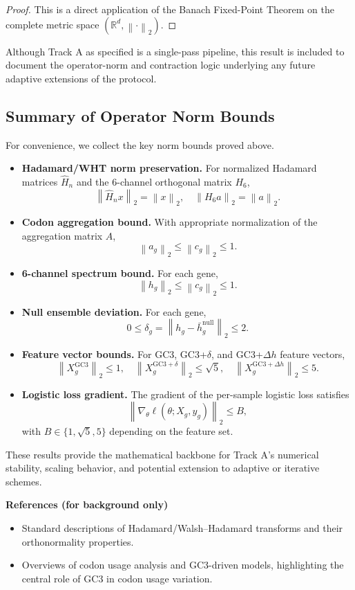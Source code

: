 \documentclass[11pt]{article}
\newcommand{\R}{\mathbb{R}}
\newcommand{\norm}[1]{\left\lVert #1 \right\rVert}
\begin{document}
\begin{proof}
This is a direct application of the Banach Fixed-Point Theorem on the complete metric space \((\R^d, \norm{\cdot}_2)\).
\end{proof}

Although Track A as specified is a single-pass pipeline, this result is included to document the operator-norm and contraction logic underlying any future adaptive extensions of the protocol.

\subsection{Summary of Operator Norm Bounds}

For convenience, we collect the key norm bounds proved above.

\begin{itemize}
  \item \textbf{Hadamard/WHT norm preservation.}
  For normalized Hadamard matrices \(\widehat{H}_n\) and the 6-channel orthogonal matrix \(H_6\),
  \[
    \norm{\widehat{H}_n x}_2 = \norm{x}_2, \quad
    \norm{H_6 a}_2 = \norm{a}_2.
  \]
  \item \textbf{Codon aggregation bound.}
  With appropriate normalization of the aggregation matrix \(A\),
  \[
    \norm{a_g}_2 \le \norm{c_g}_2 \le 1.
  \]
  \item \textbf{6-channel spectrum bound.}
  For each gene,
  \[
    \norm{h_g}_2 \le \norm{c_g}_2 \le 1.
  \]
  \item \textbf{Null ensemble deviation.}
  For each gene,
  \[
    0 \le \delta_g = \norm{h_g - \bar{h}_g^{\mathrm{null}}}_2 \le 2.
  \]
  \item \textbf{Feature vector bounds.}
  For GC3, GC3+\(\delta\), and GC3+\(\Delta h\) feature vectors,
  \[
    \norm{X_g^{\mathrm{GC3}}}_2 \le 1, \quad
    \norm{X_g^{\mathrm{GC3}+\delta}}_2 \le \sqrt{5}, \quad
    \norm{X_g^{\mathrm{GC3}+\Delta h}}_2 \le 5.
  \]
  \item \textbf{Logistic loss gradient.}
  The gradient of the per-sample logistic loss satisfies
  \[
    \norm{\nabla_\theta \ell(\theta; X_g, y_g)}_2 \le B,
  \]
  with \(B \in \{1,\sqrt{5},5\}\) depending on the feature set.
\end{itemize}

These results provide the mathematical backbone for Track A’s numerical stability, scaling behavior, and potential extension to adaptive or iterative schemes.

\vspace{1em}
\noindent\textbf{References (for background only)}
\begin{itemize}
  \item Standard descriptions of Hadamard/Walsh--Hadamard transforms and their orthonormality properties.\cite{HadamardOverview,HadamardOrthonormal,HadamardMatrixTopic}
  \item Overviews of codon usage analysis and GC3-driven models, highlighting the central role of GC3 in codon usage variation.\cite{GCUA,GC3Model,GC3Variation}
\end{itemize}
\end{document}
